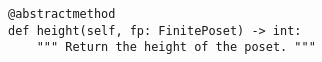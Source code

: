 \begin{verbatim}
@abstractmethod
def height(self, fp: FinitePoset) -> int:
    """ Return the height of the poset. """
\end{verbatim}